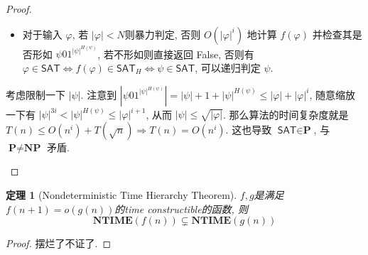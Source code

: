 \documentclass[8pt]{article}
\theoremstyle{compact}
\newtheorem{theorem}{定理}[section]
\def\le{\leqslant}
\def\NTIME{\textbf{NTIME}}
\def\P{\textbf{P}}
\def\NP{\textbf{NP}}
\def\coNP{\textbf{coNP}}
\begin{document}
\begin{proof}
\begin{itemize}
		\begin{itemize}
			\item 对于输入 $\varphi$, 若 $|\varphi| < N$则暴力判定, 否则 $O(|\varphi|^i)$ 地计算 $f(\varphi)$ 并检查其是否形如 $\psi01^{|\psi|^{H(\psi)}}$, 若不形如则直接返回 False, 否则有 $\varphi \in \textsf{SAT} \Leftrightarrow f(\varphi) \in \textsf{SAT}_H \Leftrightarrow \psi \in \textsf{SAT}$, 可以递归判定 $\psi$.
		\end{itemize}
		
		考虑限制一下 $|\psi|$. 注意到 $|\psi01^{|\psi|^{H(\psi)}}| = |\psi| + 1 + |\psi|^{H(\psi)} \le |\varphi| + |\varphi|^i$, 随意缩放一下有 $|\psi|^{3i} < |\psi|^{H(\psi)} \le |\varphi|^{i+1}$, 从而 $|\psi| \le \sqrt{|\varphi|}$. 那么算法的时间复杂度就是 $T(n) \le O(n^i) + T(\sqrt n) \Rightarrow T(n) = O(n^i)$. 这也导致 $\textsf{SAT} \in \P$, 与 $\P \neq \NP$ 矛盾.
	\end{itemize}
\end{proof}
\begin{theorem}[Nondeterministic Time Hierarchy Theorem]
	$f, g$是满足$f(n + 1) = o(g(n))$的time constructible的函数, 则
	$$\NTIME(f(n)) \subsetneq \NTIME(g(n))$$
\end{theorem}
\begin{proof}
	摆烂了不证了.

\end{proof}

\newpage
\end{document}
